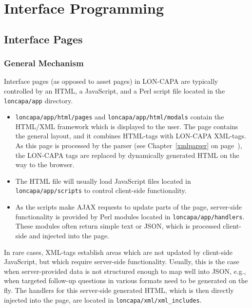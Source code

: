 \chapter{Interface Programming}
\label{interfaceprogramming}
\section{Interface Pages}


\subsection{General Mechanism}
Interface pages (as opposed to asset pages) in LON-CAPA are typically controlled by an HTML, a JavaScript, and a Perl script file located in the {\tt loncapa/app} directory.
\begin{itemize}
\item  {\tt loncapa/app/html/pages} and {\tt loncapa/app/html/modals} contain the HTML/XML framework which is displayed to the user. The page contains the general layout, and it combines HTML-tags with LON-CAPA XML-tags. As this
page is processed by the parser (see Chapter~\ref{xmlparser} on page~\pageref{xmlparser}), the LON-CAPA tags are replaced by dynamically generated HTML on the way to the browser.
\item The HTML file will usually load JavaScript files located in {\tt loncapa/app/scripts} to control client-side functionality.
\item As the scripts make AJAX requests to update parts of the page, server-side functionality is provided by Perl modules located in {\tt loncapa/app/handlers}. These modules often return simple text or JSON, which is processed client-side and injected into the page.
\end{itemize}
In rare cases, XML-tags establish areas which are not updated by client-side JavaScript, but which require server-side functionality. Usually, this is the case when server-provided data is not
structured enough to map well into JSON, e.g., when targeted follow-up questions in various formats need to be generated on the fly. The handlers for this server-side generated HTML, which is then
directly injected into the page, are located in {\tt loncapa/xml/xml\_includes}.


